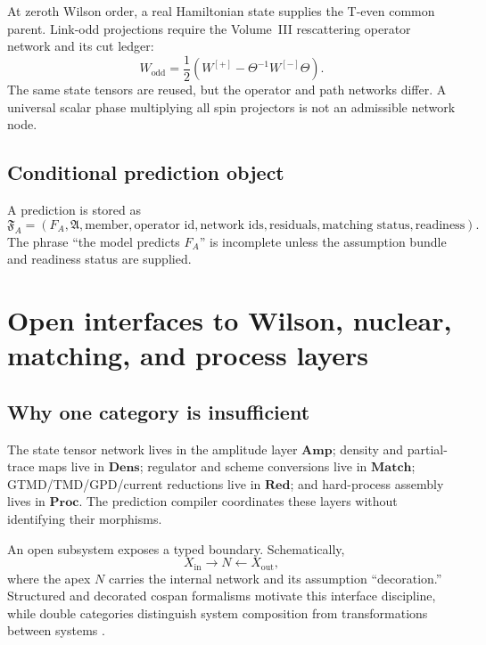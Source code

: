 \documentclass[11pt]{article}
\newcommand{\Amp}{\mathbf{Amp}}
\newcommand{\Dens}{\mathbf{Dens}}
\newcommand{\Match}{\mathbf{Match}}
\newcommand{\Red}{\mathbf{Red}}
\newcommand{\Proc}{\mathbf{Proc}}
\newcommand{\Aset}{\mathfrak A}
\begin{document}
At zeroth Wilson order, a real Hamiltonian state supplies the T-even common
parent.  Link-odd projections require the Volume~III rescattering operator
network and its cut ledger:
\begin{equation}
 W_{\mathrm{odd}}
 =
 \frac12
 \left(
 W^{[+]}-\Theta^{-1}W^{[-]}\Theta
 \right).
\label{eq:link-odd-tn}
\end{equation}
The same state tensors are reused, but the operator and path networks differ.
A universal scalar phase multiplying all spin projectors is not an admissible
network node.

\subsection{Conditional prediction object}

A prediction is stored as
\begin{equation}
 \mathfrak F_A=
 \left(
 F_A,
 \Aset,
 \text{member},
 \text{operator id},
 \text{network ids},
 \text{residuals},
 \text{matching status},
 \text{readiness}
 \right).
\label{eq:conditional-prediction-object}
\end{equation}
The phrase ``the model predicts \(F_A\)'' is incomplete unless the assumption
bundle and readiness status are supplied.

\section{Open interfaces to Wilson, nuclear, matching, and process layers}
\label{sec:open-interfaces}

\subsection{Why one category is insufficient}

The state tensor network lives in the amplitude layer \(\Amp\); density and
partial-trace maps live in \(\Dens\); regulator and scheme conversions live in
\(\Match\); GTMD/TMD/GPD/current reductions live in \(\Red\); and hard-process
assembly lives in \(\Proc\).  The prediction compiler coordinates these layers
without identifying their morphisms.

An open subsystem exposes a typed boundary.  Schematically,
\begin{equation}
 X_{\mathrm{in}}
 \longrightarrow
 N
 \longleftarrow
 X_{\mathrm{out}},
\label{eq:structured-cospan}
\end{equation}
where the apex \(N\) carries the internal network and its assumption
``decoration.''  Structured and decorated cospan formalisms motivate this
interface discipline, while double categories distinguish system composition
from transformations between systems
\cite{Fong2015,Courser2017,BaezCourser2020,Courser2020}.
\end{document}
